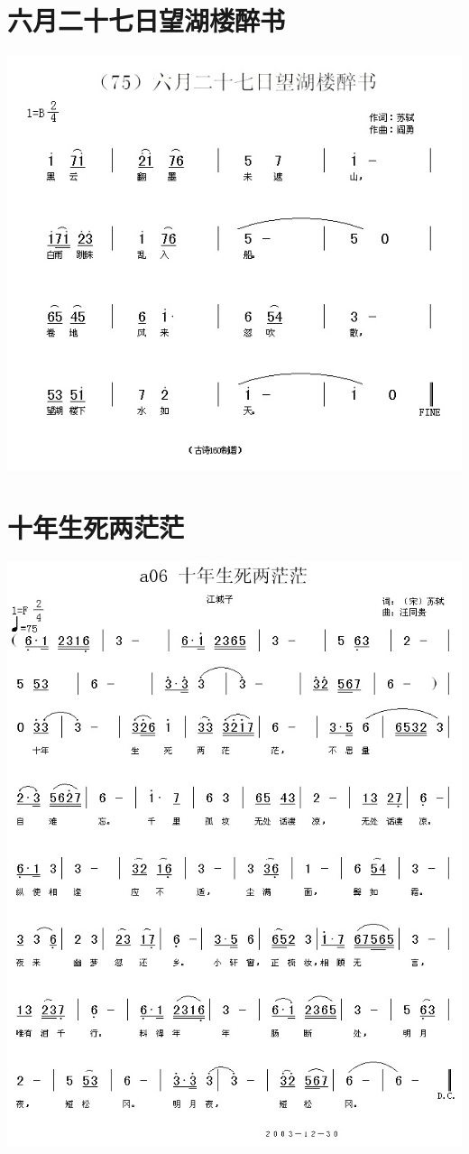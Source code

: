 \documentclass[cn,pad,chinesefont=nofont]{elegantbook}
\begin{document}
\section{六月二十七日望湖楼醉书}
    \includegraphics[width=\textwidth]{dongxiao/20200627-苏轼-六月二十七日望湖楼醉书.jpg} 
\section{十年生死两茫茫}
    \includegraphics[width=\textwidth]{dongxiao/20200627-苏轼-十年生死两茫茫.jpg} 
\end{document}
